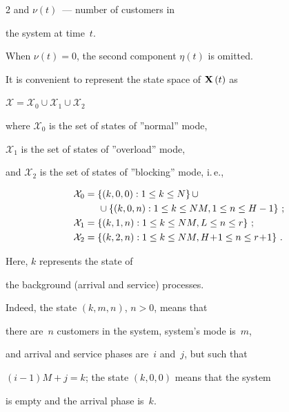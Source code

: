 \begin{multicols}{2}
and $\nu(t)$~--- number of customers in


the system at time~$t$.


When $\nu(t)=0$, the second component $\eta(t)$ is omitted.


It is convenient to represent the state space of ${\bf{X}} \left( t \right)$ as


$\mathcal{X} = {\mathcal{X}_0} \cup {\mathcal{X}_1} \cup {\mathcal{X}_2}$


where $\mathcal{X}_{0} $ is the set of states of ''normal'' mode,


$\mathcal{X}_{1} $ is the set of states of ''overload'' mode,


and $\mathcal{X}_{2}$ is the set of states of ''blocking'' mode, i.\,e.,


\begin{align*}


{\mathcal{X}_0} &= \left\{ \left( {k,0,0} \right):  1 \le k \le N  \right\}


\cup 


\\


&\hspace*{5mm}\cup \left\{ {\left( {k,0,n} \right):  1 \le k \le NM, 1 \le n \le H - 1} \right\}\,;\\


{\mathcal{X}_1} &= \left\{ {\left( {k,1,n}\right): 1 \le k \le NM,  L \le n \le r} \right\}\,;\\


{\mathcal{X}_2} &= \left\{ {\left( {k,2,n} \right): 1 \le k \le NM, 


H\! + \! 1 \le n \le r \! + \! 1} \right\}\,.


\end{align*}





\noindent


Here, $k$ represents the state of 


the background (arrival and service) processes.


Indeed, the state $(k,m,n)$, $n>0$, means that 


there are~$n$ customers in the system, system's mode is~$m$,


and arrival and service phases are~$i$ and~$j$, but such that


$(i-1)M+j=k$; the state $(k,0,0)$ means that the system


is empty and the arrival phase is~$k$.






\end{multicols}
